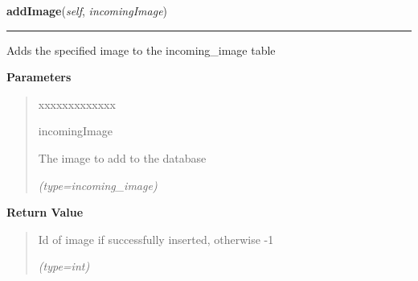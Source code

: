 \hspace{.8\funcindent}\begin{boxedminipage}{\funcwidth}

    \raggedright \textbf{addImage}(\textit{self}, \textit{incomingImage})

    \vspace{-1.5ex}

    \rule{\textwidth}{0.5\fboxrule}
\setlength{\parskip}{2ex}
    Adds the specified image to the incoming\_image table

\setlength{\parskip}{1ex}
      \textbf{Parameters}
      \vspace{-1ex}

      \begin{quote}
        \begin{Ventry}{xxxxxxxxxxxxx}

          \item[incomingImage]

          The image to add to the database

            {\it (type=incoming\_image)}

        \end{Ventry}

      \end{quote}

      \textbf{Return Value}
    \vspace{-1ex}

      \begin{quote}
      Id of image if successfully inserted, otherwise -1

      {\it (type=int)}

      \end{quote}

    \end{boxedminipage}

    \label{src:dao:incoming_image_dao:IncomingImageDAO:getImage}

    \vspace{0.5ex}

